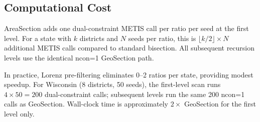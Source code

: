 \subsection{Computational Cost}

AreaSection adds one dual-constraint METIS call per ratio per seed at the
first level.
For a state with $k$ districts and $N$ seeds per ratio, this is
$\lfloor k/2 \rfloor \times N$ additional METIS calls compared to standard
bisection.
All subsequent recursion levels use the identical ncon=1 GeoSection path.

In practice, Lorenz pre-filtering eliminates 0--2 ratios per state, providing
modest speedup.
For Wisconsin (8 districts, 50 seeds), the first-level scan runs
$4 \times 50 = 200$ dual-constraint calls; subsequent levels run the same
200 ncon=1 calls as GeoSection.
Wall-clock time is approximately $2\times$ GeoSection for the first level only.
